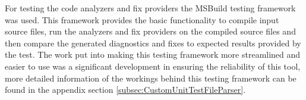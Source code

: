 For testing the code analyzers and fix providers the MSBuild testing framework was used. This framework provides the basic functionality to compile input source files, run the analyzers and fix providers on the compiled source files and then compare the generated diagnostics and fixes to expected results provided by the test.
The work put into making this testing framework more streamlined and easier to use was a significant development in ensuring the reliability of this tool, more detailed information of the workings behind this testing framework can be found in the appendix section \ref{subsec:CustomUnitTestFileParser}.



